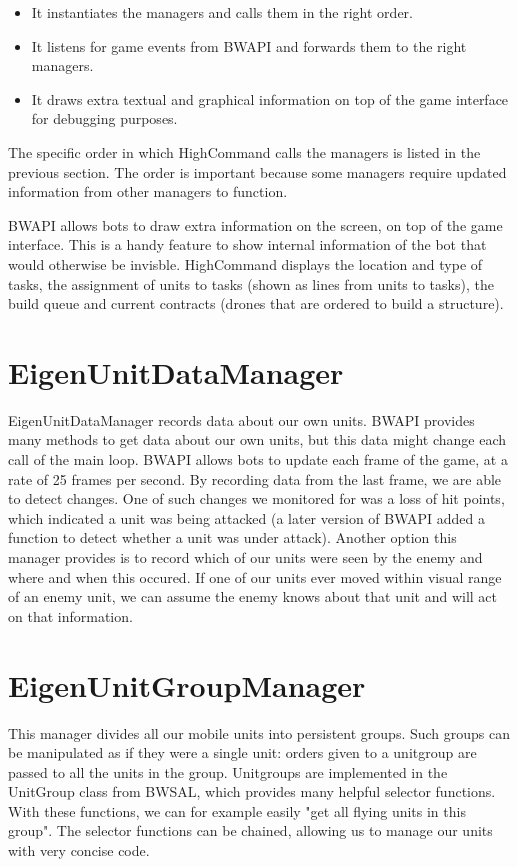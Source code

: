 \begin{itemize}
\item It instantiates the managers and calls them in the right order.
\item It listens for game events from BWAPI and forwards them to the right managers.
\item It draws extra textual and graphical information on top of the game interface for debugging purposes.
\end{itemize}

The specific order in which HighCommand calls the managers is listed in the previous section. The order is important because some managers require updated information from other managers to function.

BWAPI allows bots to draw extra information on the screen, on top of the game interface. This is a handy feature to show internal information of the bot that would otherwise be invisble. HighCommand displays the location and type of tasks, the assignment of units to tasks (shown as lines from units to tasks), the build queue and current contracts (drones that are ordered to build a structure).

\section{EigenUnitDataManager}

EigenUnitDataManager records data about our own units. BWAPI provides many methods to get data about our own units, but this data might change each call of the main loop. BWAPI allows bots to update each frame of the game, at a rate of 25 frames per second. By recording data from the last frame, we are able to detect changes. One of such changes we monitored for was a loss of hit points, which indicated a unit was being attacked (a later version of BWAPI added a function to detect whether a unit was under attack). Another option this manager provides is to record which of our units were seen by the enemy and where and when this occured. If one of our units ever moved within visual range of an enemy unit, we can assume the enemy knows about that unit and will act on that information.

\section{EigenUnitGroupManager}

This manager divides all our mobile units into persistent groups. Such groups can be manipulated as if they were a single unit: orders given to a unitgroup are passed to all the units in the group. Unitgroups are implemented in the UnitGroup class from BWSAL, which provides many helpful selector functions. With these functions, we can for example easily "get all flying units in this group". The selector functions can be chained, allowing us to manage our units with very concise code.

